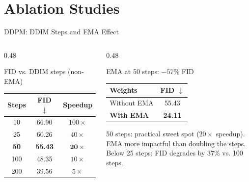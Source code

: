 \documentclass[aspectratio=169,10pt]{beamer}
\begin{document}
\section{Ablation Studies}
%
\begin{frame}{DDPM: DDIM Steps and EMA Effect}
\small
  \begin{columns}[T]
    \begin{column}{0.48\textwidth}
      \begin{block}{FID vs. DDIM steps (non-EMA)}
        \centering\vspace{3pt}
        \begin{tabular}{ccc}
          \toprule
          Steps & FID $\downarrow$ & Speedup \\
          \midrule
          10  & 66.90 & $100\times$ \\
          25  & 60.26 & $40\times$ \\
          \textbf{50}  & \textbf{55.43} & $\mathbf{20\times}$ \\
          100 & 48.35 & $10\times$ \\
          200 & 39.56 & $5\times$ \\
          \bottomrule
        \end{tabular}\vspace{3pt}
      \end{block}
    \end{column}
    \begin{column}{0.48\textwidth}
      \begin{block}{EMA at 50 steps: $-57\%$ FID}
        \centering\vspace{3pt}
        \begin{tabular}{lc}
          \toprule
          Weights & FID $\downarrow$ \\
          \midrule
          Without EMA & 55.43 \\
          \textbf{With EMA} & \textbf{24.11} \\
          \bottomrule
        \end{tabular}\vspace{3pt}
      \end{block}
      \vspace{4pt}
      50 steps: practical sweet spot ($20\times$ speedup).\\
      EMA more impactful than doubling the steps.\\
      Below 25 steps: FID degrades by 37\% vs. 100 steps.
    \end{column}
  \end{columns}
\end{frame}
\end{document}

